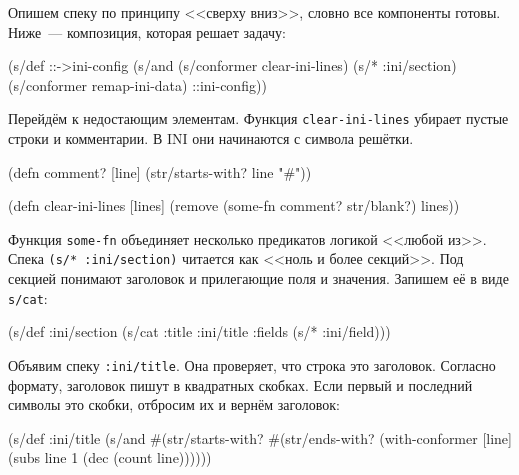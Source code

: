 Опишем спеку по принципу <<сверху вниз>>, словно все компоненты готовы. Ниже~---
композиция, которая решает задачу:

\begin{english}
  \begin{clojure}
(s/def ::->ini-config
  (s/and
   (s/conformer clear-ini-lines)
   (s/* :ini/section)
   (s/conformer remap-ini-data)
   ::ini-config))
  \end{clojure}
\end{english}


Перейдём к недостающим элементам. Функция \verb|clear-ini-lines| убирает
пустые строки и комментарии. В INI они начинаются с символа решётки.

\begin{english}
  \begin{clojure}
(defn comment? [line]
  (str/starts-with? line "#"))

(defn clear-ini-lines [lines]
  (remove (some-fn comment? str/blank?) lines))
  \end{clojure}
\end{english}


Функция \verb|some-fn| объединяет несколько предикатов логикой <<любой
из>>. Спека \verb|(s/* :ini/section)| читается как <<ноль и более
секций>>. Под секцией понимают заголовок и прилегающие поля и значения. Запишем
её в виде \verb|s/cat|:

\begin{english}
  \begin{clojure}
(s/def :ini/section
  (s/cat :title :ini/title :fields (s/* :ini/field)))
  \end{clojure}
\end{english}

Объявим спеку \verb|:ini/title|. Она проверяет, что строка это
заголовок. Согласно формату, заголовок пишут в квадратных скобках. Если первый и
последний символы это скобки, отбросим их и вернём заголовок:

\begin{english}
  \begin{clojure}
(s/def :ini/title
  (s/and
   #(str/starts-with? %
   #(str/ends-with? %
   (with-conformer [line]
     (subs line 1 (dec (count line))))))
  \end{clojure}
\end{english}

